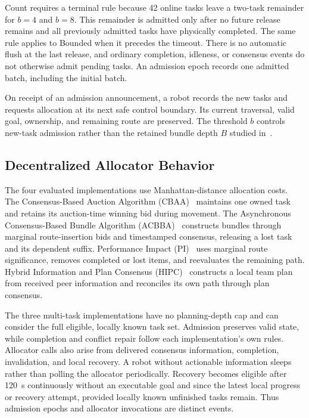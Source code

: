 \documentclass[conference]{IEEEtran}
\begin{document}
Count requires a terminal rule because 42 online tasks leave a two-task remainder for $b=4$ and $b=8$. This remainder is admitted only after no future release remains and all previously admitted tasks have physically completed. The same rule applies to Bounded when it precedes the timeout. There is no automatic flush at the last release, and ordinary completion, idleness, or consensus events do not otherwise admit pending tasks. An admission epoch records one admitted batch, including the initial batch.

On receipt of an admission announcement, a robot records the new tasks and requests allocation at its next safe control boundary. Its current traversal, valid goal, ownership, and remaining route are preserved. The threshold $b$ controls new-task admission rather than the retained bundle depth $B$ studied in~\cite{lott2026bundle}.

\subsection{Decentralized Allocator Behavior}
\label{sec:allocators}
The four evaluated implementations use Manhattan-distance allocation costs. The Consensus-Based Auction Algorithm (CBAA)~\cite{choi2009consensus} maintains one owned task and retains its auction-time winning bid during movement. The Asynchronous Consensus-Based Bundle Algorithm (ACBBA)~\cite{johnson2010asynchronous} constructs bundles through marginal route-insertion bids and timestamped consensus, releasing a lost task and its dependent suffix. Performance Impact (PI)~\cite{zhao2016impact} uses marginal route significance, removes completed or lost items, and reevaluates the remaining path. Hybrid Information and Plan Consensus (HIPC)~\cite{johnson2016hipc} constructs a local team plan from received peer information and reconciles its own path through plan consensus.

The three multi-task implementations have no planning-depth cap and can consider the full eligible, locally known task set. Admission preserves valid state, while completion and conflict repair follow each implementation's own rules. Allocator calls also arise from delivered consensus information, completion, invalidation, and local recovery. A robot without actionable information sleeps rather than polling the allocator periodically. Recovery becomes eligible after 120~s continuously without an executable goal and since the latest local progress or recovery attempt, provided locally known unfinished tasks remain. Thus admission epochs and allocator invocations are distinct events.
\end{document}
